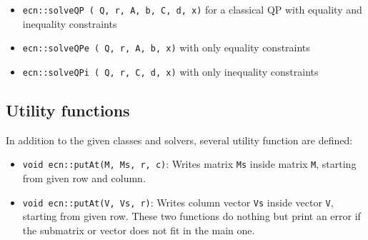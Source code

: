 \documentclass{ecnreport}
\begin{document}
\begin{itemize}
 \item \texttt{ecn::solveQP ( Q, r, A, b, C, d, x)} for a classical QP with equality and inequality constraints
 \item  \texttt{ecn::solveQPe ( Q, r, A, b, x)} with only equality constraints
 \item  \texttt{ecn::solveQPi ( Q, r, C, d, x)} with only inequality constraints
\end{itemize}


\subsection{Utility functions}

In addition to the given classes and solvers, several utility function are defined:
\begin{itemize}
 \item \texttt{void ecn::putAt(M, Ms, r, c)}: Writes matrix \texttt{Ms} inside matrix \texttt{M}, starting from given row and column.
 \item \texttt{void ecn::putAt(V, Vs, r)}: Writes column vector \texttt{Vs} inside vector \texttt{V}, starting from given row. These two functions do nothing but print an error
 if the submatrix or vector does not fit in the main one.
\end{itemize}
\end{document}
